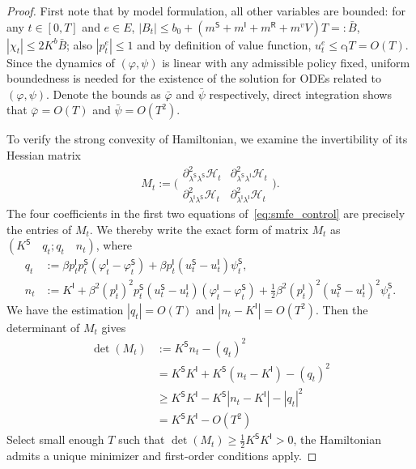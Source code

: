 \documentclass[10pt,a4paper]{amsart}
\def\sI{\mathsf{I}}
\def\sR{\mathsf{R}}
\def\sS{\mathsf{S}}
\begin{document}
\begin{proof}
    First note that by model formulation, all other variables are bounded: for any $t \in [0,T]$ and $e \in E$, $|B_t| \leq b_0+(m^\sS+m^\sI+m^\sR+m^v V)T =: \bar{B}$, $|\chi_t| \leq 2 K^b \bar{B}$; also $|p_t^e| \leq 1$ and by definition of value function, $u_t^e \leq c_\sI T = O(T)$.  Since the dynamics of $(\varphi,\psi)$ is linear with any admissible policy fixed, uniform boundedness is needed for the existence of the solution for ODEs related to $(\varphi,\psi)$. Denote the bounds as $\bar\varphi$ and $\bar\psi$ respectively, direct integration shows that $\bar\varphi = O(T)$ and $\bar\psi = O(T^2)$.

    To verify the strong convexity of Hamiltonian, we examine the invertibility of its Hessian matrix
    \small $$M_t:=\bigg(\begin{array}{cc}
\partial^2_{\lambda^{\sS}\lambda^{\sS}} \mathcal{H}_t & \partial^2_{\lambda^{\sS}\lambda^{\sI}} \mathcal{H}_t \\
\partial^2_{\lambda^{\sI}\lambda^{\sS}} \mathcal{H}_t & \partial^2_{\lambda^{\sI}\lambda^{\sI}} \mathcal{H}_t
\end{array}\bigg).$$ \normalsize
The four coefficients in the first two equations of~\eqref{eq:smfe_control} are precisely the entries of $M_t$.
    We thereby write the exact form of matrix $M_t$ as $(K^\sS \quad q_t; q_t \quad n_t)$, where
    \small
    \begin{equation*}
        \begin{aligned}
            q_t &:= \beta p_t^\sI p_t^\sS(\varphi_t^\sI-\varphi_t^\sS)+\beta p_t^\sI(u_t^\sS-u_t^\sI) \psi_t^\sS, \\
            n_t &:= K^\sI + \beta^2 (p_t^\sI)^2 p_t^\sS (u_t^\sS-u_t^\sI)(\varphi_t^\sI-\varphi_t^\sS) +\frac{1}{2}\beta^2 (p_t^\sI)^2(u_t^\sS-u_t^\sI)^2 \psi_t^\sS.
        \end{aligned}
    \end{equation*}
    \normalsize
    We have the estimation $|q_t| = O(T)$ and $|n_t - K^\sI| = O(T^2)$. Then the determinant of $M_t$ gives
    \small
    \begin{equation*}
        \begin{aligned}
            \det(M_t)&:=K^\sS n_t - (q_t)^2 \\ &= K^\sS K^\sI + K^\sS (n_t - K^\sI) - (q_t)^2 \\ &\geq K^\sS K^\sI - K^\sS |n_t - K^\sI| - |q_t|^2 \\ & = K^\sS K^\sI - O(T^2)
        \end{aligned}
    \end{equation*}
    \normalsize
    Select small enough $T$ such that $\det(M_t) \geq \frac{1}{2}K^\sS K^\sI>0$, the Hamiltonian admits a unique minimizer and first-order conditions apply.
\end{proof}
\end{document}
